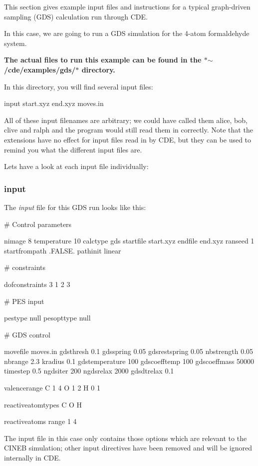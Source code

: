 This section gives example input files and instructions for a typical graph-\/driven sampling (G\+DS) calculation run through C\+DE.

In this case, we are going to run a G\+DS simulation for the 4-\/atom formaldehyde system.

{\bfseries The actual files to run this example can be found in the $\ast$$\sim$/cde/examples/gds/$\ast$ directory.}

In this directory, you will find several input files\+: \begin{DoxyVerb}input
start.xyz
end.xyz
moves.in
\end{DoxyVerb}


All of these input filenames are arbitrary; we could have called them alice, bob, clive and ralph and the program would still read them in correctly. Note that the extensions have no effect for input files read in by C\+DE, but they can be used to remind you what the different input files are.

Let\textquotesingle{}s have a look at each input file individually\+:

\subsubsection*{input}

The {\itshape input} file for this G\+DS run looks like this\+: \begin{DoxyVerb}# Control parameters

nimage 8
temperature 10
calctype gds
startfile start.xyz
endfile end.xyz
ranseed  1
startfrompath   .FALSE.
pathinit  linear

# constraints

dofconstraints 3
1 2 3

# PES input

pestype  null
pesopttype  null

# GDS control

movefile moves.in
gdsthresh 0.1
gdsspring 0.05
gdsrestspring 0.05
nbstrength 0.05
nbrange 2.3
kradius 0.1
gdstemperature 100
gdscoefftemp 100
gdscoeffmass 50000
timestep 0.5
ngdsiter 200
ngdsrelax 2000
gdsdtrelax 0.1

valencerange{
C 1 4
O 1 2
H 0 1
}

reactiveatomtypes{  
C
O
H
}

reactiveatoms{  
range 1 4
}
\end{DoxyVerb}


The input file in this case only contains those options which are relevant to the C\+I\+N\+EB simulation; other input directives have been removed and will be ignored internally in C\+DE.

